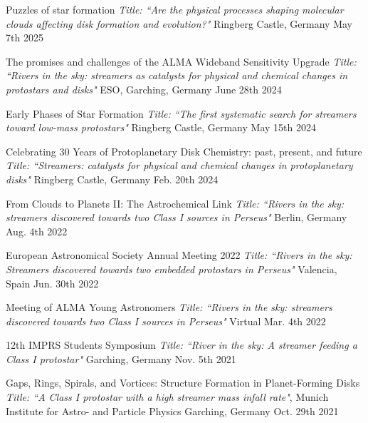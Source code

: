 
\begin{cvhonors}
    \cvhonor
	{Puzzles of star formation} %
	{\textit{Title: ``Are the physical processes shaping molecular clouds affecting disk formation and evolution?"}} %
	{Ringberg Castle, Germany} %
	{May 7th 2025} %
    
	\cvhonor
	{The promises and challenges of the ALMA Wideband Sensitivity Upgrade} %
	{\textit{Title: ``Rivers in the sky: streamers as catalysts for physical and chemical changes in protostars and disks"}} %
	{ESO, Garching, Germany} %
	{June 28th 2024} %
	
	\cvhonor
	{Early Phases of Star Formation} %
	{\textit{Title: ``The first systematic search for streamers toward low-mass protostars"}} %
	{Ringberg Castle, Germany} %
	{May 15th 2024} %

	\cvhonor
	{Celebrating 30 Years of Protoplanetary Disk Chemistry: past, present, and future} %
	{\textit{Title: ``Streamers: catalysts for physical and chemical changes in protoplanetary disks"}} %
	{Ringberg Castle, Germany} %
	{Feb. 20th 2024} %

	 \cvhonor
	{From Clouds to Planets II: The Astrochemical Link} %
	{\textit{Title: ``Rivers in the sky: streamers discovered towards two Class I sources in Perseus"}} %
	{Berlin, Germany} %
	{Aug. 4th 2022} %


	\cvhonor
	{European Astronomical Society Annual Meeting 2022} %
	{\textit{Title: ``Rivers in the sky: Streamers discovered towards two embedded protostars in Perseus"}} %
	{Valencia, Spain} %
	{Jun. 30th 2022} %

  \cvhonor
    {Meeting of ALMA Young Astronomers} %
    {\textit{Title: ``Rivers in the sky: streamers discovered towards two Class I sources in Perseus"}} %
    { Virtual} %
    {Mar. 4th 2022} %

 
  \cvhonor
    {12th IMPRS Students Symposium} %
    {\textit{Title: ``River in the sky: A streamer feeding a Class I protostar"}}%
    {Garching, Germany} %
    {Nov. 5th 2021} %

  \cvhonor
    {Gaps, Rings, Spirals, and Vortices: Structure Formation in Planet-Forming Disks} %
    {\textit{Title: ``A Class I protostar with a high streamer mass infall rate"}, Munich Institute for Astro- and Particle Physics} %
    {Garching, Germany} %
    {Oct. 29th 2021} %


\end{cvhonors}
